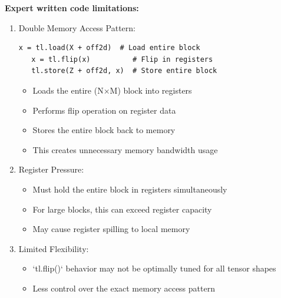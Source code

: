 \documentclass{article}
\begin{document}
\textbf{Expert written code limitations:}
\begin{enumerate}
    \item Double Memory Access Pattern:
   \begin{lstlisting}[style=pythonstyle]
   x = tl.load(X + off2d)  # Load entire block
   x = tl.flip(x)          # Flip in registers
   tl.store(Z + off2d, x)  # Store entire block
   \end{lstlisting}
   \begin{itemize}
       \item    Loads the entire (N×M) block into registers
   \item Performs flip operation on register data
   \item Stores the entire block back to memory
   \item This creates unnecessary memory bandwidth usage
   \end{itemize}


    \item Register Pressure: 
   \begin{itemize}
   \item Must hold the entire block in registers simultaneously
   \item For large blocks, this can exceed register capacity
   \item May cause register spilling to local memory
   \end{itemize}


    \item Limited Flexibility:
    \begin{itemize}
   \item `tl.flip()` behavior may not be optimally tuned for all tensor shapes
   \item Less control over the exact memory access pattern
    \end{itemize}

\end{enumerate}
\end{document}

